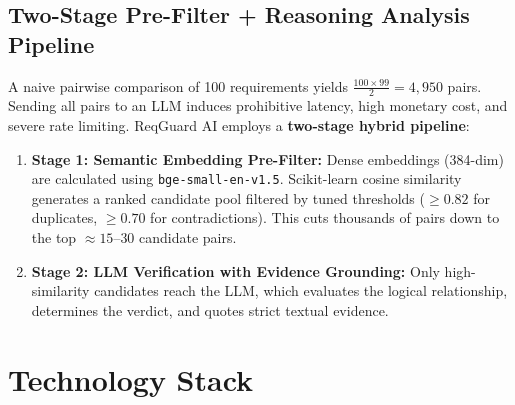 \documentclass[11pt,a4paper]{article}
\begin{document}
\subsection{Two-Stage Pre-Filter + Reasoning Analysis Pipeline}
A naive pairwise comparison of 100 requirements yields $\frac{100 \times 99}{2} = 4{,}950$ pairs. Sending all pairs to an LLM induces prohibitive latency, high monetary cost, and severe rate limiting. ReqGuard AI employs a \textbf{two-stage hybrid pipeline}:
\begin{enumerate}
  \item \textbf{Stage 1: Semantic Embedding Pre-Filter:} Dense embeddings (384-dim) are calculated using \texttt{bge-small-en-v1.5}. Scikit-learn cosine similarity generates a ranked candidate pool filtered by tuned thresholds ($\ge 0.82$ for duplicates, $\ge 0.70$ for contradictions). This cuts thousands of pairs down to the top $\approx 15\text{--}30$ candidate pairs.
  \item \textbf{Stage 2: LLM Verification with Evidence Grounding:} Only high-similarity candidates reach the LLM, which evaluates the logical relationship, determines the verdict, and quotes strict textual evidence.
\end{enumerate}

\section{Technology Stack}
\end{document}
